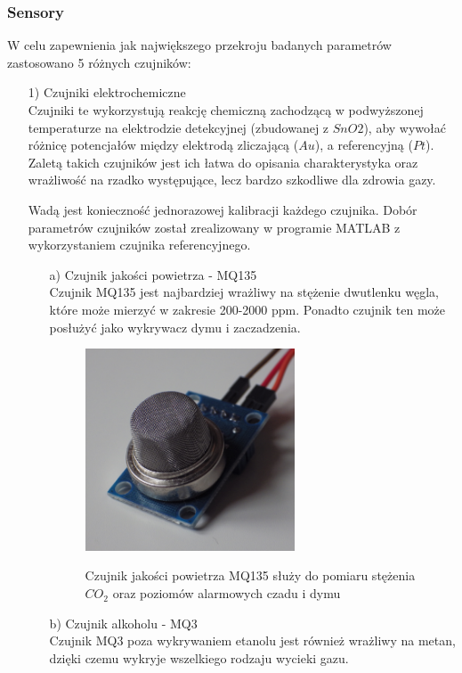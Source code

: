 \documentclass[12pt,a4paper]{article}
\begin{document}
\subsubsection{Sensory}
W celu zapewnienia jak największego przekroju badanych parametrów zastosowano 5 różnych czujników:
\begin{enumerate}
	\item[1)] Czujniki elektrochemiczne\\
	Czujniki te wykorzystują reakcję chemiczną zachodzącą w podwyższonej temperaturze na elektrodzie detekcyjnej (zbudowanej z $SnO2$), aby wywołać różnicę potencjałów między elektrodą zliczającą ($Au$), a referencyjną ($Pt$). Zaletą takich czujników jest ich łatwa do opisania charakterystyka oraz wrażliwość na rzadko występujące, lecz bardzo szkodliwe dla zdrowia gazy. 

	Wadą jest konieczność jednorazowej kalibracji każdego czujnika. Dobór parametrów czujników został zrealizowany w programie MATLAB z wykorzystaniem czujnika referencyjnego.

	\begin{enumerate}
		\item[a)] Czujnik jakości powietrza - MQ135 \\
		Czujnik MQ135 jest najbardziej wrażliwy na stężenie dwutlenku węgla, które może mierzyć w zakresie 200-2000 ppm. Ponadto czujnik ten może posłużyć jako wykrywacz dymu i zaczadzenia.
		
\begin{figure}[!h]
	\centering
	\includegraphics[height =60mm]{MQ135.jpg}
	\label{MQ135}
	\caption{Czujnik jakości powietrza MQ135 służy do pomiaru stężenia $CO_2$ oraz poziomów alarmowych czadu i dymu}
\end{figure}

		\item[b)] Czujnik alkoholu - MQ3 \\	
		Czujnik MQ3 poza wykrywaniem etanolu jest również wrażliwy na metan, dzięki czemu wykryje wszelkiego rodzaju wycieki gazu.
		

\end{enumerate}
\end{enumerate}
\end{document}
